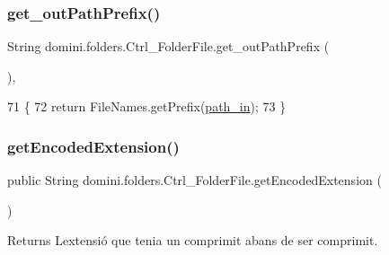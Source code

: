 \subsubsection{\texorpdfstring{get\+\_\+out\+Path\+Prefix()}{get\_outPathPrefix()}}
{\footnotesize\ttfamily String domini.\+folders.\+Ctrl\+\_\+\+Folder\+File.\+get\+\_\+out\+Path\+Prefix (\begin{DoxyParamCaption}{ }\end{DoxyParamCaption})\hspace{0.3cm}{\ttfamily [inline]}, {\ttfamily [private]}}


\begin{DoxyCode}
71                                        \{
72         \textcolor{keywordflow}{return} FileNames.getPrefix(\hyperlink{classdomini_1_1folders_1_1Ctrl__FolderFile_a0d3946bb2832a1f34d0c2227df5c71c4}{path\_in});
73     \}
\end{DoxyCode}
\mbox{\label{classdomini_1_1folders_1_1Ctrl__FolderFile_a61d9dfde0932787a2398af3ddf99c34b}} 
\subsubsection{\texorpdfstring{get\+Encoded\+Extension()}{getEncodedExtension()}}
{\footnotesize\ttfamily public String domini.\+folders.\+Ctrl\+\_\+\+Folder\+File.\+get\+Encoded\+Extension (\begin{DoxyParamCaption}{ }\end{DoxyParamCaption})\hspace{0.3cm}{\ttfamily [inline]}}

\begin{DoxyReturn}{Returns}
L\textquotesingle{}extensió que tenia un comprimit abans de ser comprimit. 
\end{DoxyReturn}

